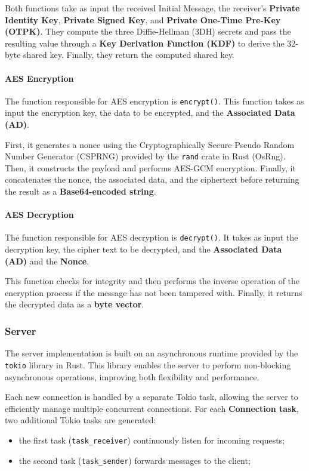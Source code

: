 \noindent Both functions take as input the received Initial Message, the receiver's \textbf{Private Identity Key}, \textbf{Private Signed Key}, and \textbf{Private One-Time Pre-Key (OTPK)}. They compute the three Diffie-Hellman (3DH) secrets and pass the resulting value through a \textbf{Key Derivation Function (KDF)} to derive the 32-byte shared key. Finally, they return the computed shared key.  

\paragraph{AES Encryption}  
\sloppy  
The function responsible for AES encryption is \texttt{encrypt()}. This function takes as input the encryption key, the data to be encrypted, and the \textbf{Associated Data (AD)}.  

\noindent First, it generates a nonce using the Cryptographically Secure Pseudo Random Number Generator (CSPRNG) provided by the \texttt{rand} crate in Rust (OsRng). Then, it constructs the payload and performs AES-GCM encryption. Finally, it concatenates the nonce, the associated data, and the ciphertext before returning the result as a \textbf{Base64-encoded string}.  


\paragraph{AES Decryption}  
\sloppy  
The function responsible for AES decryption is \texttt{decrypt()}. It takes as input the decryption key, the cipher text to be decrypted, and the \textbf{Associated Data (AD)} and the \textbf{Nonce}.  

\noindent This function checks for integrity and then performs the inverse operation of the encryption process if the message has not been tampered with. Finally, it returns the decrypted data as a \textbf{byte vector}.  

\subsubsection{Server}  
\sloppy  
The server implementation is built on an asynchronous runtime provided by the \texttt{tokio} library in Rust. This library enables the server to perform non-blocking asynchronous operations, improving both flexibility and performance.  

\noindent Each new connection is handled by a separate Tokio task, allowing the server to efficiently manage multiple concurrent connections. For each \textbf{Connection task}, two additional Tokio tasks are generated:
\begin{itemize}
    \item the first task (\texttt{task\_receiver}) continuously listen for incoming requests;
    \item the second task (\texttt{task\_sender}) forwards messages to the client;
\end{itemize}

